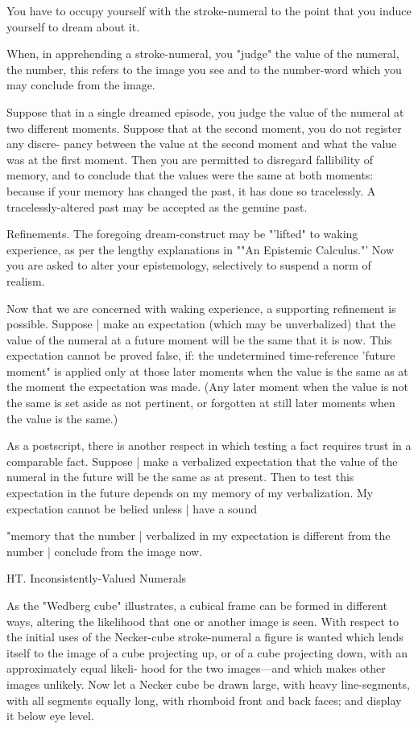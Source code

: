 You have to occupy yourself with the stroke-numeral to the point that you induce 
yourself to dream about it. 

When, in apprehending a stroke-numeral, you "judge" the value of the numeral, the 
number, this refers to the image you see and to the number-word which you may conclude 
from the image. 

Suppose that in a single dreamed episode, you judge the value of the numeral at two 
different moments. Suppose that at the second moment, you do not register any discre- 
pancy between the value at the second moment and what the value was at the first 
moment. Then you are permitted to disregard fallibility of memory, and to conclude that the 
values were the same at both moments: because if your memory has changed the past, it 
has done so tracelessly. A tracelessly-altered past may be accepted as the genuine past. 


Refinements. The foregoing dream-construct may be "'lifted" to waking experience, as 
per the lengthy explanations in ""An Epistemic Calculus."' Now you are asked to alter your 
epistemology, selectively to suspend a norm of realism. 

Now that we are concerned with waking experience, a supporting refinement is 
possible. Suppose | make an expectation (which may be unverbalized) that the value of the 
numeral at a future moment will be the same that it is now. This expectation cannot be 
proved false, if: the undetermined time-reference 'future moment" is applied only at those 
later moments when the value is the same as at the moment the expectation was made. 
(Any later moment when the value is not the same is set aside as not pertinent, or forgotten 
at still later moments when the value is the same.) 


As a postscript, there is another respect in which testing a fact requires trust in a 
comparable fact. Suppose | make a verbalized expectation that the value of the numeral in 
the future will be the same as at present. Then to test this expectation in the future depends 
on my memory of my verbalization. My expectation cannot be belied unless | have a sound 

"memory that the number | verbalized in my expectation is different from the number | 
conclude from the image now. 


HT. Inconsistently-Valued Numerals 


As the "Wedberg cube" illustrates, a cubical frame can be formed 
in different ways, altering the likelihood that one or another image is 
seen. With respect to the initial uses of the Necker-cube stroke-numeral 
a figure is wanted which lends itself to the image of a cube projecting 
up, or of a cube projecting down, with an approximately equal likeli- 
hood for the two images---and which makes other images unlikely. 
Now let a Necker cube be drawn large, with heavy line-segments, with 
all segments equally long, with rhomboid front and back faces; and 
display it below eye level. 


